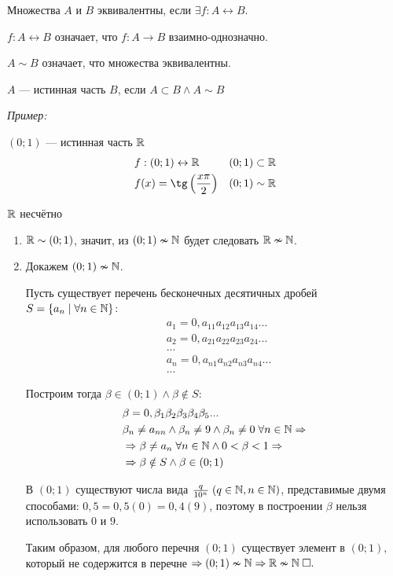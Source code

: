 \documentclass{article}
\begin{document}


Множества $A$ и $B$	эквивалентны, если $\exists f:A\leftrightarrow B$.

$f:A\leftrightarrow B$ означает, что $f:A\to B$ взаимно-однозначно.

$A\sim B$ означает, что множества эквивалентны.


$A$ --- истинная часть $B$, если $A\subset B\land A\sim B$

{\it Пример:}

$(0;1)$ --- истинная часть $\mathbb{R}$
\begin{align*}
	 & f:(0;1)\leftrightarrow\R            &  & (0;1)\subset\R \\
	 & f(x)=\tg\left(\frac{x\pi}{2}\right) &  & (0;1)\sim\R
\end{align*}

\theorem

$\mathbb{R}$ несчётно

\proof
\begin{enumerate}
	\item{}$\mathbb{R}\sim(0;1)$, значит, из $(0;1)\nsim\mathbb{N}$ будет следовать $\mathbb{R}\nsim\mathbb{N}$.
	\item{}Докажем $(0;1)\nsim\mathbb{N}$.

	Пусть существует перечень бесконечных десятичных дробей $S=\{a_n\;|\;\forall n\in\mathbb{N}\}$:
	\begin{align*}
		 & a_1=0,a_{11}a_{12}a_{13}a_{14}... \\
		 & a_2=0,a_{21}a_{22}a_{23}a_{24}... \\
		 & ...                               \\
		 & a_n=0,a_{n1}a_{n2}a_{n3}a_{n4}... \\
		 & ...
	\end{align*}

	Построим тогда $\beta\in(0;1)\land\beta\notin S$:
	\begin{align*}
		 & \beta=0,\beta_1\beta_2\beta_3\beta_4\beta_5...                               \\
		 & \beta_n\neq a_{nn}\land \beta_n\neq 9\land\beta_n\neq 0\;\forall n\in\mathbb{N}\Rightarrow \\
		 & \Rightarrow \beta\neq a_n\;\forall n\in\mathbb{N} \land  0<\beta<1\Rightarrow                    \\
		 & \Rightarrow \beta\notin S\land \beta\in(0;1)
	\end{align*}

	В $(0;1)$ существуют числа вида $\frac{q}{10^{n}}\;(q\in\mathbb{N},n\in\mathbb{N})$, представимые двумя способами:
	$0,5=0,5(0)=0,4(9)$, поэтому в построении $\beta$ нельзя использовать $0$ и $9$.

	Таким образом, для любого перечня $(0;1)$ существует элемент в $(0;1)$, который не содержится в перечне $\Rightarrow(0;1)\nsim\mathbb{N}\Rightarrow\mathbb{R}\nsim\mathbb{N}\;\square.$

\end{enumerate}
\end{document}
